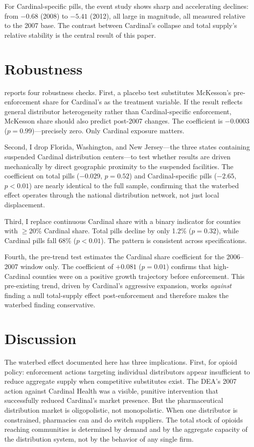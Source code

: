 \documentclass[12pt]{article}
\begin{document}
For Cardinal-specific pills, the event study shows sharp and accelerating declines: from $-0.68$ (2008) to $-5.41$ (2012), all large in magnitude, all measured relative to the 2007 base. The contrast between Cardinal's collapse and total supply's relative stability is the central result of this paper.

\section{Robustness}

 reports four robustness checks. First, a placebo test substitutes McKesson's pre-enforcement share for Cardinal's as the treatment variable. If the result reflects general distributor heterogeneity rather than Cardinal-specific enforcement, McKesson share should also predict post-2007 changes. The coefficient is $-0.0003$ ($p = 0.99$)---precisely zero. Only Cardinal exposure matters.

Second, I drop Florida, Washington, and New Jersey---the three states containing suspended Cardinal distribution centers---to test whether results are driven mechanically by direct geographic proximity to the suspended facilities. The coefficient on total pills ($-0.029$, $p = 0.52$) and Cardinal-specific pills ($-2.65$, $p < 0.01$) are nearly identical to the full sample, confirming that the waterbed effect operates through the national distribution network, not just local displacement.

Third, I replace continuous Cardinal share with a binary indicator for counties with $\geq 20\%$ Cardinal share. Total pills decline by only 1.2\% ($p = 0.32$), while Cardinal pills fall 68\% ($p < 0.01$). The pattern is consistent across specifications.

Fourth, the pre-trend test estimates the Cardinal share coefficient for the 2006--2007 window only. The coefficient of $+0.081$ ($p = 0.01$) confirms that high-Cardinal counties were on a positive growth trajectory before enforcement. This pre-existing trend, driven by Cardinal's aggressive expansion, works \textit{against} finding a null total-supply effect post-enforcement and therefore makes the waterbed finding conservative.

\section{Discussion}

The waterbed effect documented here has three implications. First, for opioid policy: enforcement actions targeting individual distributors appear insufficient to reduce aggregate supply when competitive substitutes exist. The DEA's 2007 action against Cardinal Health was a visible, punitive intervention that successfully reduced Cardinal's market presence. But the pharmaceutical distribution market is oligopolistic, not monopolistic. When one distributor is constrained, pharmacies can and do switch suppliers. The total stock of opioids reaching communities is determined by demand and by the aggregate capacity of the distribution system, not by the behavior of any single firm.
\end{document}
